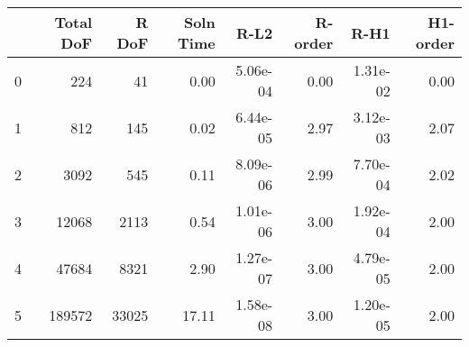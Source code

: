 \documentclass[12pt]{extarticle}
\numberwithin{equation}{section}    %
\begin{document}
\begin{tabular}{lrrrrrrr}
\hline
{} &  Total DoF &  R DoF &  Soln Time &      R-L2 &  R-order &      R-H1 &  H1-order \\
\hline
0 &        224 &     41 &       0.00 &  5.06e-04 &     0.00 &  1.31e-02 &      0.00 \\
1 &        812 &    145 &       0.02 &  6.44e-05 &     2.97 &  3.12e-03 &      2.07 \\
2 &       3092 &    545 &       0.11 &  8.09e-06 &     2.99 &  7.70e-04 &      2.02 \\
3 &      12068 &   2113 &       0.54 &  1.01e-06 &     3.00 &  1.92e-04 &      2.00 \\
4 &      47684 &   8321 &       2.90 &  1.27e-07 &     3.00 &  4.79e-05 &      2.00 \\
5 &     189572 &  33025 &      17.11 &  1.58e-08 &     3.00 &  1.20e-05 &      2.00 \\
\hline
\end{tabular}
\end{document}
